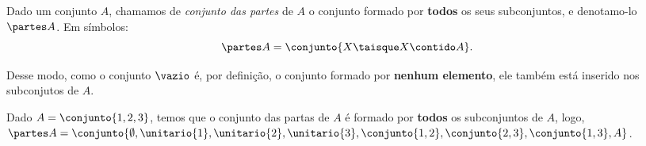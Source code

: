\begin{definition}
	\label{def:conjunto-das-partes} 
	Dado um conjunto $A$, chamamos de \emph{conjunto das partes} de $A$ o conjunto formado por \textbf{todos} os seus subconjuntos, e denotamo-lo $\partes A$. Em símbolos:
	\[
		\partes A = \conjunto{ X \taisque X \contido A}.
	\]
\end{definition}

Desse modo, como o conjunto $\vazio$ é, por definição, o conjunto formado por \textbf{nenhum elemento}, ele também está inserido nos subconjutos de $A$.

\begin{example}
	\label{exem-powerset-basico}
	Dado $A = \conjunto{1, 2, 3}$, temos que o conjunto das partas de $A$ é formado por \textbf{todos} os subconjuntos de $A$, logo, $\partes A = \conjunto{\emptyset, \unitario{1}, \unitario{2}, \unitario{3}, \conjunto{1,2}, \conjunto{2,3}, \conjunto{1,3}, A}$.
\end{example}
